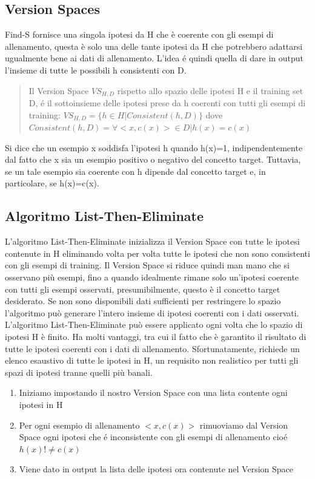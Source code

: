 \documentclass{article}
\begin{document}
\subsection{Version Spaces}
Find-S fornisce una singola ipotesi da H che è coerente con gli esempi di allenamento, questa è solo una delle tante ipotesi da H che potrebbero adattarsi ugualmente bene ai dati di allenamento. L'idea é quindi quella di dare in output l'insieme di tutte le possibili h consistenti con D.
\begin{quote}
    Il Version Space $VS_{H,D}$ rispetto allo spazio delle ipotesi H e il training set D, é il sottoinsieme delle ipotesi prese da h coerenti con tutti gli esempi di training: \newline $VS_{H,D} = \{h \in H | Consistent(h,D)\}$ \newline 
    dove $Consistent(h,D) = \forall<x,c(x)> \in D | h(x)=c(x)$
\end{quote}
Si dice che un esempio x soddisfa l'ipotesi h quando h(x)=1, indipendentemente dal fatto che x sia un esempio positivo o negativo del concetto target. Tuttavia, se un tale esempio sia coerente con h dipende dal concetto target e, in particolare, se h(x)=c(x).
\clearpage

\subsection{Algoritmo List-Then-Eliminate}
L'algoritmo List-Then-Eliminate inizializza il Version Space con tutte le ipotesi contenute in H eliminando volta per volta tutte le ipotesi che non sono consistenti con gli esempi di training. Il Version Space si riduce quindi man mano che si osservano più esempi, fino a quando idealmente rimane solo un'ipotesi coerente con tutti gli esempi osservati, presumibilmente, questo è il concetto target desiderato. Se non sono disponibili dati sufficienti per restringere lo spazio l'algoritmo può generare l'intero insieme di ipotesi coerenti con i dati osservati. L'algoritmo List-Then-Eliminate può essere applicato ogni volta che lo spazio di ipotesi H è finito. Ha molti vantaggi, tra cui il fatto che è garantito il risultato di tutte le ipotesi coerenti con i dati di allenamento. Sfortunatamente, richiede un elenco esaustivo di tutte le ipotesi in H, un requisito non realistico per tutti gli spazi di ipotesi tranne quelli più banali.
\begin{enumerate}
    \item Iniziamo impostando il nostro Version Space con una lista contente ogni ipotesi in H
    \item Per ogni esempio di allenamento $<x,c(x)>$ rimuoviamo dal Version Space ogni ipotesi che é inconsistente con gli esempi di allenamento cioé $h(x)!\neq c(x)$
    \item Viene dato in output la lista delle ipotesi ora contenute nel Version Space
\end{enumerate}
\end{document}
